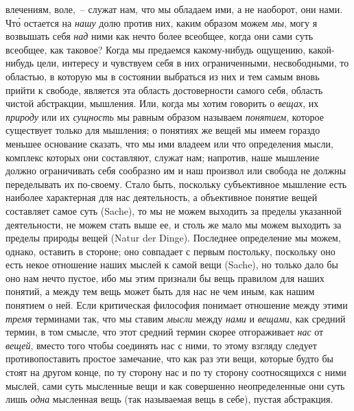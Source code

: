 влечениям, воле,~-- служат нам, что мы обладаем ими, а
не наоборот, они нами. Чт\'о остается на \emph{нашу} долю против
них, каким образом можем \emph{мы}, могу я возвышать
себя \emph{над} ними как нечто более всеобщее, когда они сами
суть всеобщее, как таковое? Когда мы предаемся какому-нибудь
ощущению, какой-нибудь цели, интересу и чувствуем
себя в них ограниченными, несвободными, то областью,
в которую мы в состоянии выбраться из них и тем
самым вновь прийти к свободе, является эта область достоверности
самого себя, область чистой абстракции,
мышления. Или, когда мы хотим говорить о \emph{вещах}, их
\emph{природу} или их \emph{сущность} мы равным образом называем
\emph{понятием}, которое существует только для мышления; о
понятиях же вещей мы имеем гораздо меньшее основание
сказать, что мы ими владеем или что определения
мысли, комплекс которых они составляют, служат нам;
напротив, наше мышление должно ограничивать себя сообразно
им и наш произвол или свобода не должны
переделывать их по-своему. Стало быть, поскольку субъективное
мышление есть наиболее характерная для нас
деятельность, а объективное понятие вещей составляет
самое суть (Sache), то мы не можем выходить за пределы
указанной деятельности, не можем стать выше ее, и столь
же мало мы можем выходить за пределы природы вещей
(Natur der Dinge). Последнее определение мы можем, однако,
оставить в стороне; оно совпадает с первым постольку,
поскольку оно есть некое отношение наших мыслей
к самой вещи (Sache), но только дало бы оно нам
нечто пустое, ибо мы этим признали бы вещь правилом
для наших понятий, а между тем вещь может быть для
нас не чем иным, как нашим понятием о ней. Если критическая
философия понимает отношение между этими
\emph{тремя} терминами так, что мы ставим \emph{мысли} между \emph{нами}
и \emph{вещами}, как средний термин, в том смысле, что этот
средний термин скорее отгораживает \emph{нас} от \emph{вещей},
вместо того чтобы соединять нас с ними, то этому взгляду
следует противопоставить простое замечание, что как раз
эти вещи, которые будто бы стоят на другом конце, по
ту сторону нас и по ту сторону соотносящихся с ними
мыслей, сами суть мысленные вещи и как совершенно
неопределенные они суть лишь \emph{одна} мысленная вещь
(так называемая вещь в себе), пустая абстракция.


